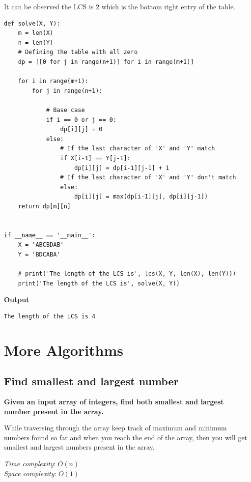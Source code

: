 \documentclass[a4paper,11pt]{book}
\begin{document}
\noindent It can be observed the LCS is 2 which is the bottom right entry of the table.

\begin{lstlisting}
def solve(X, Y):
    m = len(X)
    n = len(Y)
    # Defining the table with all zero
    dp = [[0 for j in range(n+1)] for i in range(m+1)]

    for i in range(m+1):
        for j in range(n+1):

            # Base case
            if i == 0 or j == 0:
                dp[i][j] = 0
            else:
                # If the last character of 'X' and 'Y' match
                if X[i-1] == Y[j-1]:
                    dp[i][j] = dp[i-1][j-1] + 1
                # If the last character of 'X' and 'Y' don't match
                else:
                    dp[i][j] = max(dp[i-1][j], dp[i][j-1])
    return dp[m][n]
 
 
if __name__ == '__main__':
    X = 'ABCBDAB'
    Y = 'BDCABA'
 
    # print('The length of the LCS is', lcs(X, Y, len(X), len(Y)))
    print('The length of the LCS is', solve(X, Y))
\end{lstlisting}
\textbf{Output}
\begin{lstlisting}
The length of the LCS is 4
\end{lstlisting}



\chapter{More Algorithms}

\section{Find smallest and largest number}

\textbf{Given an input array of integers,  find both smallest and largest number present in the array.}
\vspace{5mm}

\noindent While traversing through the array keep track of maximum and minimum numbers found so far and when you reach the end of the array, then you will get smallest and largest numbers present in the array.

\vspace{5mm}

\noindent \textit{Time complexity}:  $O(n)$\\
\noindent \textit{Space complexity}: $O(1)$
\end{document}
